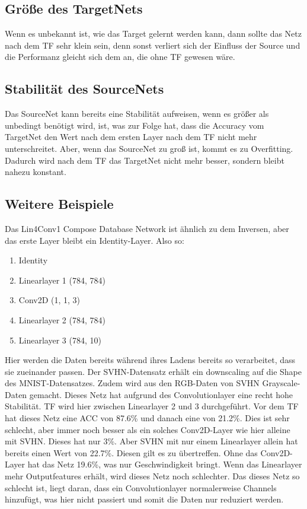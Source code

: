 \subsection{Größe des TargetNets}
    Wenn es unbekannt ist, wie das Target gelernt werden kann, dann sollte das 
    Netz nach dem TF sehr klein sein, denn sonst verliert sich der Einfluss der Source
    und die Performanz gleicht sich dem an, die ohne TF gewesen wäre.

\subsection{Stabilität des SourceNets}
    Das SourceNet kann bereits eine Stabilität aufweisen, wenn es größer als unbedingt 
    benötigt wird, ist, was zur Folge hat, dass die Accuracy vom TargetNet den Wert nach dem 
    ersten Layer nach dem TF nicht mehr unterschreitet.
    Aber, wenn das SourceNet zu groß ist, kommt es zu Overfitting. Dadurch wird nach 
    dem TF das TargetNet nicht mehr besser, sondern bleibt nahezu konstant.
    
\subsection{Weitere Beispiele}
    Das Lin4Conv1 Compose Database Network ist ähnlich zu dem Inversen, aber das 
    erste Layer bleibt ein Identity-Layer. Also so: 
    \begin{enumerate}
        \item Identity
        \item Linearlayer 1 (784, 784)
        \item Conv2D (1, 1, 3)
        \item Linearlayer 2 (784, 784)
        \item Linearlayer 3 (784, 10)
    \end{enumerate}
    Hier werden die Daten bereits während 
    ihres Ladens bereits so verarbeitet, dass sie zueinander passen. Der SVHN-Datensatz 
    erhält ein downscaling auf die Shape des MNIST-Datensatzes. Zudem wird aus den 
    RGB-Daten von SVHN Grayscale-Daten gemacht. Dieses Netz hat aufgrund des Convolutionlayer 
    eine recht hohe Stabilität. TF wird hier zwischen Linearlayer 2 und 3 durchgeführt. 
    Vor dem TF hat dieses Netz eine ACC von 87.6\% und danach eine von 21.2\%. Dies ist sehr 
    schlecht, aber immer noch besser als ein solches Conv2D-Layer wie hier alleine mit SVHN. 
    Dieses hat nur 3\%. Aber SVHN mit nur einem Linearlayer allein hat bereits einen Wert 
    von 22.7\%. Diesen gilt es zu übertreffen.
    Ohne das Conv2D-Layer hat das Netz 19.6\%, was nur Geschwindigkeit bringt. 
    Wenn das Linearlayer mehr Outputfeatures erhält, wird dieses Netz noch schlechter. 
    Das dieses Netz so schlecht ist, liegt daran, dass ein Convolutionlayer normalerweise 
    Channels hinzufügt, was hier nicht passiert und somit die Daten nur reduziert werden.

